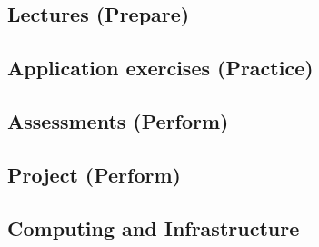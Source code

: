 \documentclass[
  12pt]{article}
\begin{document}
\hypertarget{lectures-prepare}{%
\subsection{Lectures (Prepare)}\label{lectures-prepare}}

\hypertarget{application-exercises-practice}{%
\subsection{Application exercises
(Practice)}\label{application-exercises-practice}}

\hypertarget{assessments-perform}{%
\subsection{Assessments (Perform)}\label{assessments-perform}}

\hypertarget{project-perform}{%
\subsection{Project (Perform)}\label{project-perform}}

\hypertarget{computing-and-infrastructure}{%
\subsection{Computing and
Infrastructure}\label{computing-and-infrastructure}}


\renewcommand\refname{Discussion}
  
\end{document}
